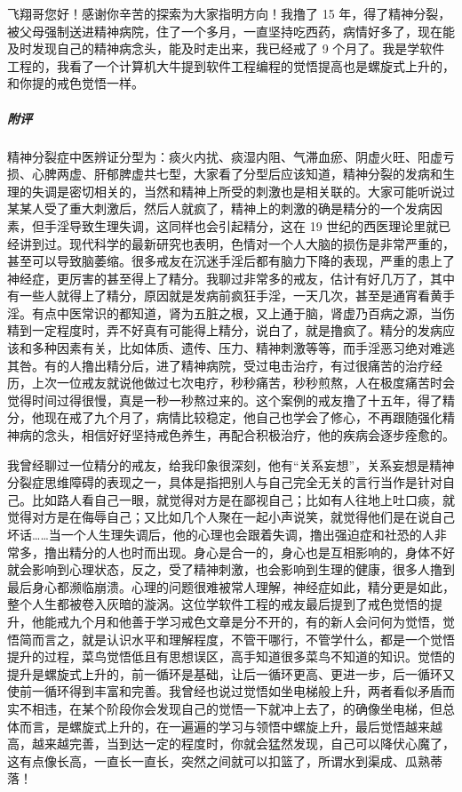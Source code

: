 \begin{case}
    飞翔哥您好！感谢你辛苦的探索为大家指明方向！我撸了 15 年，得了精神分裂，被父母强制送进精神病院，住了一个多月，一直坚持吃西药，病情好多了，现在能及时发现自己的精神病念头，能及时走出来，我已经戒了 9 个月了。我是学软件工程的，我看了一个计算机大牛提到软件工程编程的觉悟提高也是螺旋式上升的，和你提的戒色觉悟一样。
    \subparagraph{附评} 精神分裂症中医辨证分型为：痰火内扰、痰湿内阻、气滞血瘀、阴虚火旺、阳虚亏损、心脾两虚、肝郁脾虚共七型，大家看了分型后应该知道，精神分裂的发病和生理的失调是密切相关的，当然和精神上所受的刺激也是相关联的。大家可能听说过某某人受了重大刺激后，然后人就疯了，精神上的刺激的确是精分的一个发病因素，但手淫导致生理失调，这同样也会引起精分，这在 19 世纪的西医理论里就已经讲到过。现代科学的最新研究也表明，色情对一个人大脑的损伤是非常严重的，甚至可以导致脑萎缩。很多戒友在沉迷手淫后都有脑力下降的表现，严重的患上了神经症，更厉害的甚至得上了精分。我聊过非常多的戒友，估计有好几万了，其中有一些人就得上了精分，原因就是发病前疯狂手淫，一天几次，甚至是通宵看黄手淫。有点中医常识的都知道，肾为五脏之根，又上通于脑，肾虚乃百病之源，当伤精到一定程度时，弄不好真有可能得上精分，说白了，就是撸疯了。精分的发病应该和多种因素有关，比如体质、遗传、压力、精神刺激等等，而手淫恶习绝对难逃其咎。有的人撸出精分后，进了精神病院，受过电击治疗，有过很痛苦的治疗经历，上次一位戒友就说他做过七次电疗，秒秒痛苦，秒秒煎熬，人在极度痛苦时会觉得时间过得很慢，真是一秒一秒熬过来的。这个案例的戒友撸了十五年，得了精分，他现在戒了九个月了，病情比较稳定，他自己也学会了修心，不再跟随强化精神病的念头，相信好好坚持戒色养生，再配合积极治疗，他的疾病会逐步痊愈的。

    我曾经聊过一位精分的戒友，给我印象很深刻，他有“关系妄想”，关系妄想是精神分裂症思维障碍的表现之一，具体是指把别人与自己完全无关的言行当作是针对自己。比如路人看自己一眼，就觉得对方是在鄙视自己；比如有人往地上吐口痰，就觉得对方是在侮辱自己；又比如几个人聚在一起小声说笑，就觉得他们是在说自己坏话……当一个人生理失调后，他的心理也会跟着失调，撸出强迫症和社恐的人非常多，撸出精分的人也时而出现。身心是合一的，身心也是互相影响的，身体不好就会影响到心理状态，反之，受了精神刺激，也会影响到生理的健康，很多人撸到最后身心都濒临崩溃。心理的问题很难被常人理解，神经症如此，精分更是如此，整个人生都被卷入灰暗的漩涡。这位学软件工程的戒友最后提到了戒色觉悟的提升，他能戒九个月和他善于学习戒色文章是分不开的，有的新人会问何为觉悟，觉悟简而言之，就是认识水平和理解程度，不管干哪行，不管学什么，都是一个觉悟提升的过程，菜鸟觉悟低且有思想误区，高手知道很多菜鸟不知道的知识。觉悟的提升是螺旋式上升的，前一循环是基础，让后一循环更高、更进一步，后一循环又使前一循环得到丰富和完善。我曾经也说过觉悟如坐电梯般上升，两者看似矛盾而实不相违，在某个阶段你会发现自己的觉悟一下就冲上去了，的确像坐电梯，但总体而言，是螺旋式上升的，在一遍遍的学习与领悟中螺旋上升，最后觉悟越来越高，越来越完善，当到达一定的程度时，你就会猛然发现，自己可以降伏心魔了，这有点像长高，一直长一直长，突然之间就可以扣篮了，所谓水到渠成、瓜熟蒂落！
\end{case}

